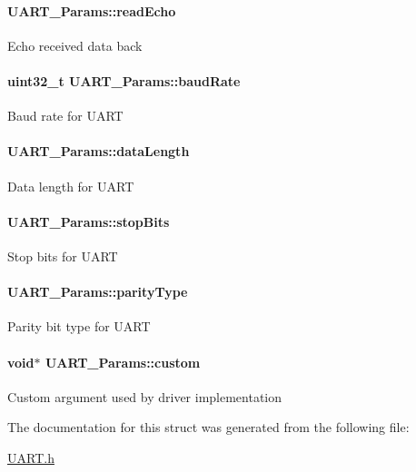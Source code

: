 \paragraph[{read\-Echo}]{ U\-A\-R\-T\-\_\-\-Params\-::read\-Echo}\label{struct_u_a_r_t___params_a61642ef82bbcfc98494739a98afff58a}
Echo received data back 
\paragraph[{baud\-Rate}]{\setlength{\rightskip}{0pt plus 5cm}uint32\-\_\-t U\-A\-R\-T\-\_\-\-Params\-::baud\-Rate}\label{struct_u_a_r_t___params_afadb98d0a0ef6e17240bab79306e7828}
Baud rate for U\-A\-R\-T 
\paragraph[{data\-Length}]{ U\-A\-R\-T\-\_\-\-Params\-::data\-Length}\label{struct_u_a_r_t___params_adb937e0b27c71886e58953312d3d1376}
Data length for U\-A\-R\-T 
\paragraph[{stop\-Bits}]{ U\-A\-R\-T\-\_\-\-Params\-::stop\-Bits}\label{struct_u_a_r_t___params_a59f12dc5b7329f484573521c0e2b3d78}
Stop bits for U\-A\-R\-T 
\paragraph[{parity\-Type}]{ U\-A\-R\-T\-\_\-\-Params\-::parity\-Type}\label{struct_u_a_r_t___params_acaa90dc09cd820477c5bfaae152a2010}
Parity bit type for U\-A\-R\-T 
\paragraph[{custom}]{\setlength{\rightskip}{0pt plus 5cm}void$\ast$ U\-A\-R\-T\-\_\-\-Params\-::custom}\label{struct_u_a_r_t___params_ab4df0d3f6c1e1121f303d11271abb7a1}
Custom argument used by driver implementation 

The documentation for this struct was generated from the following file\-:\begin{DoxyCompactItemize}
\item 
\hyperlink{_u_a_r_t_8h}{U\-A\-R\-T.\-h}\end{DoxyCompactItemize}
